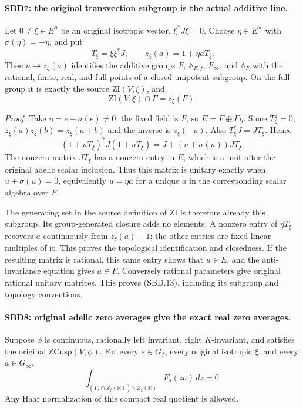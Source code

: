 \paragraph{SBD7: the original transvection subgroup is the actual additive line.}
\label{claim:SBD7}
Let \(0\ne\xi\in E^n\) be an original isotropic vector,
\(\xi^*J\xi=0\).  Choose \(\eta\in E^\times\) with
\(\sigma(\eta)=-\eta\), and put
\[
 T_\xi=\xi\xi^*J,\qquad
 z_\xi(a)=1+\eta a T_\xi.
 \tag{SBD.12}
\]
Then \(a\mapsto z_\xi(a)\) identifies the additive groups
\(F\), \(\mathbb A_{F,f}\), \(F_\infty\), and \(\mathbb A_F\)
with the rational, finite, real, and full points of a closed
unipotent subgroup.  On the full group it is exactly the source
\(\mathrm{ZI}(V,\xi)\), and
\[
       \mathrm{ZI}(V,\xi)\cap\Gamma=z_\xi(F).
 \tag{SBD.13}
\]

\emph{Proof.}
Take \(\eta=e-\sigma(e)\ne0\); the fixed field is \(F\), so
\(E=F\oplus F\eta\).  Since \(T_\xi^2=0\),
\(z_\xi(a)z_\xi(b)=z_\xi(a+b)\) and the inverse is
\(z_\xi(-a)\).  Also \(T_\xi^*J=JT_\xi\).  Hence
\[
 (1+uT_\xi)^*J(1+uT_\xi)
      =J+(u+\sigma(u))JT_\xi.
 \tag{SBD.14}
\]
The nonzero matrix \(JT_\xi\) has a nonzero entry in \(E\),
which is a unit after the original adelic scalar inclusion.
Thus this matrix is unitary exactly when
\(u+\sigma(u)=0\), equivalently \(u=\eta a\) for a unique
\(a\) in the corresponding scalar algebra over \(F\).

The generating set in the source definition of \(\mathrm{ZI}\)
is therefore already this subgroup.  Its group-generated closure
adds no elements.  A nonzero entry of \(\eta T_\xi\) recovers
\(a\) continuously from \(z_\xi(a)-1\); the other entries are
fixed linear multiples of it.  This proves the topological
identification and closedness.  If the resulting matrix is
rational, this same entry shows that \(u\in E\), and the
anti-invariance equation gives \(a\in F\).  Conversely rational
parameters give original rational unitary matrices.  This proves
(SBD.13), including its subgroup and topology conventions.

\paragraph{SBD8: original adelic zero averages give the exact real zero averages.}
\label{claim:SBD8}
Suppose \(\phi\) is continuous, rationally left invariant,
right \(K\)-invariant, and satisfies the original
\(\mathrm{ZCusp}(V,\phi)\).  For every \(s\in G_f\), every
original isotropic \(\xi\), and every \(a\in G_\infty\),
\[
 \int_{(\Gamma_s\cap Z_\xi(\mathbb R))\backslash
                  Z_\xi(\mathbb R)} F_s(za)\,dz=0.
 \tag{SBD.15}
\]
Any Haar normalization of this compact real quotient is allowed.

